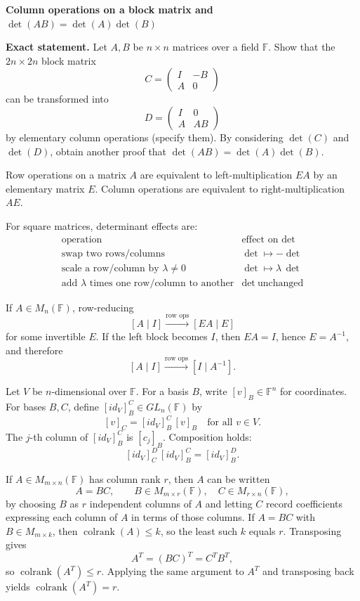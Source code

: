 \begin{problem}[CP-I-0080]
\label{prob:cp-i-0080}
\textbf{Column operations on a block matrix and \(\det(AB)=\det(A)\det(B)\)}

\textbf{Exact statement.}
\hspace*{1.5em}Let \(A,B\) be \(n\times n\) matrices over a field \(\mathbb F\).
Show that the \(2n\times 2n\) block matrix
\[
C=\begin{pmatrix}
	I & -B\\
	A & 0
\end{pmatrix}
\]
can be transformed into
\[
D=\begin{pmatrix}
	I & 0\\
	A & AB
\end{pmatrix}
\]
by elementary column operations (specify them).
By considering \(\det(C)\) and \(\det(D)\), obtain another proof that \(\det(AB)=\det(A)\det(B)\).



Row operations on a matrix \(A\) are equivalent to left-multiplication \(EA\) by an elementary matrix \(E\).
Column operations are equivalent to right-multiplication \(AE\).

For square matrices, determinant effects are:
\[
\begin{array}{c|c}
	\text{operation} & \text{effect on }\det \\ \hline
	\text{swap two rows/columns} & \det \mapsto -\det\\
	\text{scale a row/column by }\lambda\neq0 & \det \mapsto \lambda\,\det\\
	\text{add }\lambda\text{ times one row/column to another} & \det\ \text{unchanged}
\end{array}
\]

If \(A\in M_n(\mathbb F)\), row-reducing
\[
[A\mid I] \xrightarrow{\text{row ops}} [EA\mid E]
\]
for some invertible \(E\).
If the left block becomes \(I\), then \(EA=I\), hence \(E=A^{-1}\), and therefore
\[
[A\mid I] \xrightarrow{\text{row ops}} [I\mid A^{-1}].
\]

Let \(V\) be \(n\)-dimensional over \(\mathbb F\). For a basis \(B\), write \([v]_B\in\mathbb F^n\) for coordinates.
For bases \(B,C\), define \([id_V]^C_B\in GL_n(\mathbb F)\) by
\[
[v]_C = [id_V]^C_B\,[v]_B \quad \text{for all }v\in V.
\]
The \(j\)-th column of \([id_V]^C_B\) is \([c_j]_B\).
Composition holds:
\[
[id_V]^D_C\,[id_V]^C_B = [id_V]^D_B.
\]

If \(A\in M_{m\times n}(\mathbb F)\) has column rank \(r\), then \(A\) can be written
\[
A=BC,\qquad B\in M_{m\times r}(\mathbb F),\quad C\in M_{r\times n}(\mathbb F),
\]
by choosing \(B\) as \(r\) independent columns of \(A\) and letting \(C\) record coefficients expressing each column of \(A\)
in terms of those columns.
If \(A=BC\) with \(B\in M_{m\times k}\), then \(\operatorname{colrank}(A)\le k\), so the least such \(k\) equals \(r\).
Transposing gives
\[
A^T=(BC)^T=C^T B^T,
\]
so \(\operatorname{colrank}(A^T)\le r\). Applying the same argument to \(A^T\) and transposing back yields
\(\operatorname{colrank}(A^T)=r\).


\end{problem}
